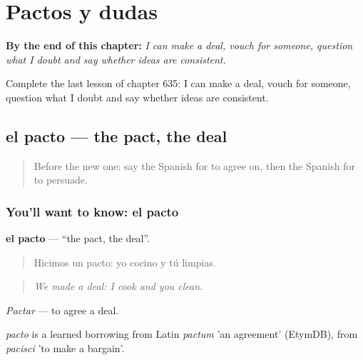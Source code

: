 
\chapter{Pactos y dudas}
\label{ch:es-pactos-y-dudas}

\begin{chapteropening}
\textbf{By the end of this chapter:} \emph{I can make a deal, vouch for someone, question what I doubt and say whether ideas are consistent.}

Complete the last lesson of chapter 635: I can make a deal, vouch for someone, question what I doubt and say whether ideas are consistent.
\end{chapteropening}

\section[el pacto]{el pacto — the pact, the deal}

\label{lesson:ES-C635-pacto}



\begin{quote}
Before the new one: say the Spanish for to agree on, then the Spanish for to persuade.
\end{quote}

\subsection*{You'll want to know: el pacto}
\textbf{el pacto} — \textquotedblleft{}the pact, the deal\textquotedblright{}.

\begin{quote}
Hicimos un pacto: yo cocino y tú limpias.
\end{quote}

\begin{quote}
\emph{We made a deal: I cook and you clean.}
\end{quote}

\emph{Pactar} — to agree a deal.

\begin{cousinweb}
\emph{pacto} is a learned borrowing from Latin \emph{pactum} 'an agreement' (EtymDB), from \emph{pacisci} 'to make a bargain'.
\end{cousinweb}

